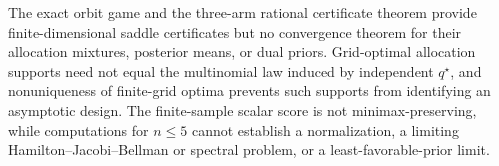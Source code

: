 The exact orbit game and the three-arm rational certificate theorem provide finite-dimensional saddle certificates but no convergence theorem for their allocation mixtures, posterior means, or dual priors. Grid-optimal allocation supports need not equal the multinomial law induced by independent \(q^\star\), and nonuniqueness of finite-grid optima prevents such supports from identifying an asymptotic design. The finite-sample scalar score is not minimax-preserving, while computations for \(n\leq5\) cannot establish a normalization, a limiting Hamilton--Jacobi--Bellman or spectral problem, or a least-favorable-prior limit.